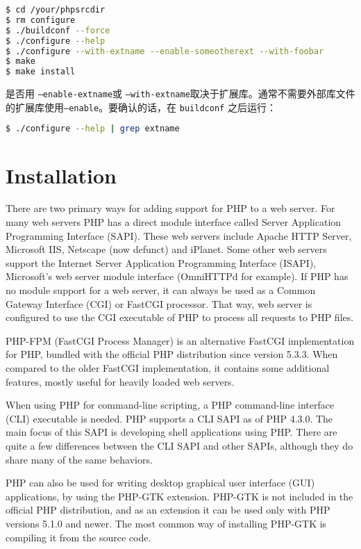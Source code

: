 \begin{lstlisting}[language=bash]
$ cd /your/phpsrcdir 
$ rm configure
$ ./buildconf --force
$ ./configure --help
$ ./configure --with-extname --enable-someotherext --with-foobar
$ make
$ make install
\end{lstlisting}


是否用 \texttt{--enable-extname}或 \texttt{--with-extname}取决于扩展库。通常不需要外部库文件的扩展库使用\texttt{--enable}。要确认的话，在 \texttt{buildconf} 之后运行：

\begin{lstlisting}[language=bash]
$ ./configure --help | grep extname
\end{lstlisting}

\chapter{Installation}

There are two primary ways for adding support for PHP to a web server. For many web servers PHP has a direct module interface called Server Application Programming Interface (SAPI). These web servers include Apache HTTP Server, Microsoft IIS, Netscape (now defunct) and iPlanet. Some other web servers support the Internet Server Application Programming Interface (ISAPI), Microsoft's web server module interface (OmniHTTPd for example). If PHP has no module support for a web server, it can always be used as a Common Gateway Interface (CGI) or FastCGI processor. That way, web server is configured to use the CGI executable of PHP to process all requests to PHP files.


PHP-FPM (FastCGI Process Manager) is an alternative FastCGI implementation for PHP, bundled with the official PHP distribution since version 5.3.3. When compared to the older FastCGI implementation, it contains some additional features, mostly useful for heavily loaded web servers.

When using PHP for command-line scripting, a PHP command-line interface (CLI) executable is needed. PHP supports a CLI SAPI as of PHP 4.3.0. The main focus of this SAPI is developing shell applications using PHP. There are quite a few differences between the CLI SAPI and other SAPIs, although they do share many of the same behaviors.

PHP can also be used for writing desktop graphical user interface (GUI) applications, by using the PHP-GTK extension. PHP-GTK is not included in the official PHP distribution, and as an extension it can be used only with PHP versions 5.1.0 and newer. The most common way of installing PHP-GTK is compiling it from the source code.


